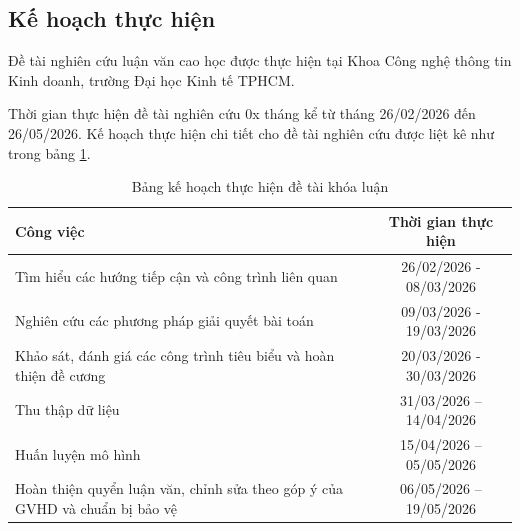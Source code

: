 \documentclass{article}[12pt]
\begin{document}
{    
    \subsection{Kế hoạch thực hiện}
    Đề tài nghiên cứu luận văn cao học được thực hiện tại Khoa Công nghệ thông tin Kinh doanh, trường Đại học Kinh tế TPHCM.
    
    Thời gian thực hiện đề tài nghiên cứu 0x tháng kể từ tháng 26/02/2026 đến 26/05/2026. Kế hoạch thực hiện chi tiết cho đề tài nghiên cứu được liệt kê như trong bảng \ref{tab:kehoach}.

    \begin{table}[htbp]
        \centering
        \renewcommand{\arraystretch}{1.4}
        \begin{tabularx}{\textwidth}{|>{\raggedright\arraybackslash}X|c|}
        \hline
        \rowcolor[gray]{0.9}
        \textbf{Công việc} & \textbf{Thời gian thực hiện} \\ \hline
        Tìm hiểu các hướng tiếp cận và công trình liên quan & 26/02/2026 - 08/03/2026 \\ \hline
        Nghiên cứu các phương pháp giải quyết bài toán & 09/03/2026 - 19/03/2026 \\ \hline
        Khảo sát, đánh giá các công trình tiêu biểu và hoàn thiện đề cương & 20/03/2026 - 30/03/2026 \\ \hline
        Thu thập dữ liệu & 31/03/2026 – 14/04/2026 \\ \hline
        Huấn luyện mô hình & 15/04/2026 – 05/05/2026 \\ \hline
        Hoàn thiện quyển luận văn, chỉnh sửa theo góp ý của GVHD và chuẩn bị bảo vệ & 06/05/2026 – 19/05/2026 \\ \hline
        \end{tabularx}
        \caption{Bảng kế hoạch thực hiện đề tài khóa luận}
        \label{tab:kehoach}
    \end{table}
    
    }
    \pagebreak 

    
    
    \nocite{*}

    
\end{document}
